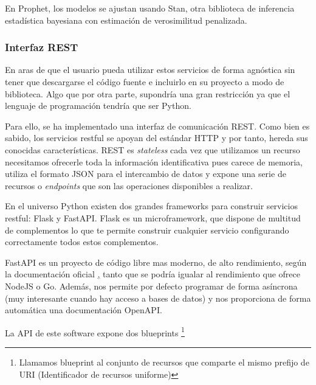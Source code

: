En Prophet, los modelos se ajustan usando Stan, otra biblioteca de inferencia estadística bayesiana con estimación de verosimilitud penalizada.

\subsubsection{Interfaz REST}
En aras de que el usuario pueda utilizar estos servicios de forma agnóstica sin tener que descargarse el código fuente e incluirlo en su proyecto a modo de biblioteca. Algo que por otra parte, supondría una gran restricción ya que el lenguaje de programación tendría que ser Python.

Para ello, se ha implementado una interfaz de comunicación REST. Como bien es sabido, los servicios restful se apoyan del estándar HTTP y por tanto, hereda sus conocidas características. REST es \textit{stateless} cada vez que utilizamos un recurso necesitamos ofrecerle toda la información identificativa pues carece de memoria, utiliza el formato JSON para el intercambio de datos y expone una serie de recursos o \textit{endpoints} que son las operaciones disponibles a realizar.

En el universo Python existen dos grandes frameworks para construir servicios restful: Flask y FastAPI.
Flask es un microframework, que dispone de multitud de complementos lo que te permite construir cualquier servicio configurando correctamente todos estos complementos. 

FastAPI es un proyecto de código libre mas moderno, de alto rendimiento, según la documentación oficial \href{https://fastapi.tiangolo.com}, tanto que se podría igualar al rendimiento que ofrece NodeJS o Go. Además, nos permite por defecto programar de forma asíncrona (muy interesante cuando hay acceso a bases de datos) y nos proporciona de forma automática una documentación OpenAPI.

La API de este software expone dos blueprints \footnote{Llamamos blueprint al conjunto de recursos que comparte el mismo prefijo de URI (Identificador de recursos uniforme)}

